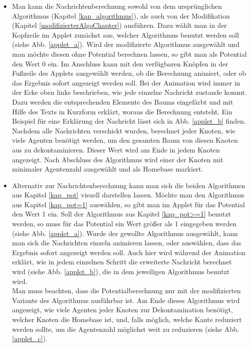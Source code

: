 \begin{itemize}
	\item Man kann die Nachrichtenberechnung sowohl von dem ursprünglichen Algorithmus (Kapitel \ref{kap_algorithmus}), als auch von der Modifikation (Kapitel \ref{modifizierterAlgoChapter}) ausführen. Dazu wählt man in der Kopfzeile im Applet zunächst aus, welcher Algorithmus benutzt werden soll (siehe Abb. \ref{applet_a}). Wird der modifizierte Algorithmus ausgewählt und man möchte diesen ohne Potential berechnen lassen, so gibt man als Potential den Wert 0 ein. Im Anschluss kann mit den verfügbaren Knöpfen in der Fußzeile des Applets ausgewählt werden, ob die Berechnung animiert, oder ob das Ergebnis sofort angezeigt werden soll. Bei der Animation wird immer in der Ecke oben links beschrieben, wie jede einzelne Nachricht zustande kommt. Dazu werden die entsprechenden Elemente des Baums eingefärbt und mit Hilfe des Texts in Kurzform erklärt, woraus die Berechnung entsteht. Ein Beispiel für eine Erklärung der Nachricht lässt sich in Abb. \ref{applet_b} finden. Nachdem alle Nachrichten verschickt wurden, berechnet jeder Knoten, wie viele Agenten benötigt werden, um den gesamten Baum von diesen Knoten aus zu dekontaminieren. Dieser Wert wird am Ende in jedem Knoten angezeigt. Nach Abschluss des Algorithmus wird einer der Knoten mit minimaler Agentenzahl ausgewählt und als Homebase markiert.
	
	\item Alternativ zur Nachrichtenberechnung kann man sich die beiden Algorithmen aus Kapitel \ref{kap_pot} visuell darstellen lassen. Möchte man den Algorithmus aus Kapitel \ref{kap_pot=1} auswählen, so gibt man im Applet für das Potential den Wert 1 ein. Soll der Algorithmus aus Kapitel \ref{kap_pot>=1} benutzt werden, so muss für das Potential ein Wert größer als 1 eingegeben werden (siehe Abb. \ref{applet_a}). Wurde der gewollte Algorithmus ausgewählt, kann man sich die Nachrichten einzeln animieren lassen, oder auswählen, dass das Ergebnis sofort angezeigt werden soll. Auch hier wird während der Animation erklärt, wie in jedem einzelnen Schritt die erweiterte Nachricht berechnet wird (siehe Abb. \ref{applet_b}), die in dem jeweiligen Algorithmus benutzt wird. \\
	Man muss beachten, dass die Potentialberechnung nur mit der modifizierten Variante des Algorithmus ausführbar ist. Am Ende dieses Algorithmus wird angezeigt, wie viele Agenten jeder Knoten zur Dekontamination benötigt, welcher Knoten die Homebase ist, und, falls möglich, welche Kante reduziert werden sollte, um die Agentenzahl möglichst weit zu reduzieren (siehe Abb. \ref{applet_c}).
	

\end{itemize}
